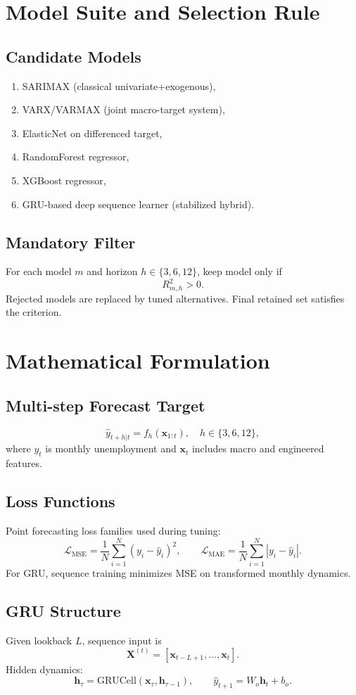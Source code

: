 \documentclass[11pt,a4paper]{article}
\begin{document}
\section{Model Suite and Selection Rule}
\subsection{Candidate Models}
\begin{enumerate}
\item SARIMAX (classical univariate+exogenous),
\item VARX/VARMAX (joint macro-target system),
\item ElasticNet on differenced target,
\item RandomForest regressor,
\item XGBoost regressor,
\item GRU-based deep sequence learner (stabilized hybrid).
\end{enumerate}

\subsection{Mandatory Filter}
For each model \(m\) and horizon \(h\in\{3,6,12\}\), keep model only if
\[
R^2_{m,h}>0.
\]
Rejected models are replaced by tuned alternatives. Final retained set satisfies the criterion.

\section{Mathematical Formulation}
\subsection{Multi-step Forecast Target}
\[
\hat{y}_{t+h|t}=f_h(\mathbf{x}_{1:t}),\quad h\in\{3,6,12\},
\]
where \(y_t\) is monthly unemployment and \(\mathbf{x}_t\) includes macro and engineered features.

\subsection{Loss Functions}
Point forecasting loss families used during tuning:
\[
\mathcal{L}_{\text{MSE}}=\frac{1}{N}\sum_{i=1}^{N}(y_i-\hat{y}_i)^2,\qquad
\mathcal{L}_{\text{MAE}}=\frac{1}{N}\sum_{i=1}^{N}|y_i-\hat{y}_i|.
\]
For GRU, sequence training minimizes MSE on transformed monthly dynamics.

\subsection{GRU Structure}
Given lookback \(L\), sequence input is
\[
\mathbf{X}^{(t)}=[\mathbf{x}_{t-L+1},\dots,\mathbf{x}_t].
\]
Hidden dynamics:
\[
\mathbf{h}_\tau=\mathrm{GRUCell}(\mathbf{x}_\tau,\mathbf{h}_{\tau-1}),\qquad
\hat{y}_{t+1}=W_o\mathbf{h}_t+b_o.
\]
\end{document}
